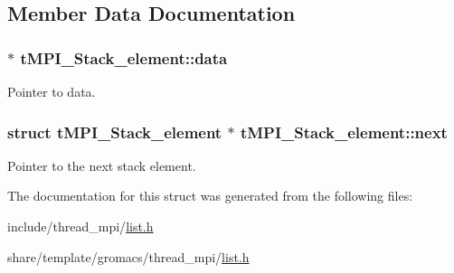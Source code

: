 \subsection{\-Member \-Data \-Documentation}
\hypertarget{structtMPI__Stack__element_a2922b567443e26c64eee23169c8acb0e}{
\subsubsection[{data}]{ $\ast$ {\bf t\-M\-P\-I\-\_\-\-Stack\-\_\-element\-::data}}}\label{structtMPI__Stack__element_a2922b567443e26c64eee23169c8acb0e}
\-Pointer to data. \hypertarget{structtMPI__Stack__element_a1b090224fc36ec976f7e99ee2ff35de6}{
\subsubsection[{next}]{\setlength{\rightskip}{0pt plus 5cm}struct {\bf t\-M\-P\-I\-\_\-\-Stack\-\_\-element} $\ast$ {\bf t\-M\-P\-I\-\_\-\-Stack\-\_\-element\-::next}}}\label{structtMPI__Stack__element_a1b090224fc36ec976f7e99ee2ff35de6}
\-Pointer to the next stack element. 

\-The documentation for this struct was generated from the following files\-:\begin{DoxyCompactItemize}
\item 
include/thread\-\_\-mpi/\hyperlink{include_2thread__mpi_2list_8h}{list.\-h}\item 
share/template/gromacs/thread\-\_\-mpi/\hyperlink{share_2template_2gromacs_2thread__mpi_2list_8h}{list.\-h}\end{DoxyCompactItemize}
